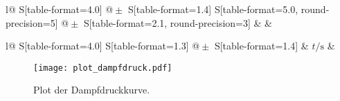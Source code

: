   \begin{table}[htbp]
    \centering
    \caption{Ermittelte Steigung und Verdampfungswärme.}
    \label{tab:ergebnis_L}
    \begin{tabular}{
        l@{}
        S[table-format=4.0] @{${}\pm{}$} S[table-format=1.4]
        S[table-format=5.0, round-precision=5] @{${}\pm{}$} S[table-format=2.1, round-precision=3]}
      \toprule
      & 
      &  \\
      \midrule
      
      \bottomrule
    \end{tabular}
  \end{table}

  \begin{table}[htbp]
    \centering
    \caption{Ermittelte Massendurchsätze.}
    \label{tab:ergebnisse_durchsatz}
    \begin{tabular}{
        l@{}
        S[table-format=4.0]
        S[table-format=1.3] @{${}\pm{}$} S[table-format=1.4]}
      \toprule
      & $t / \si{\second}$
      &  \\
      \midrule
      
      \bottomrule
    \end{tabular}
  \end{table}

  \begin{figure}[htpb]
    \centering
    \texttt{[image: plot\_dampfdruck.pdf]}
    \caption{Plot der Dampfdruckkurve.}
    \label{fig:dampfdruck}
  \end{figure}

